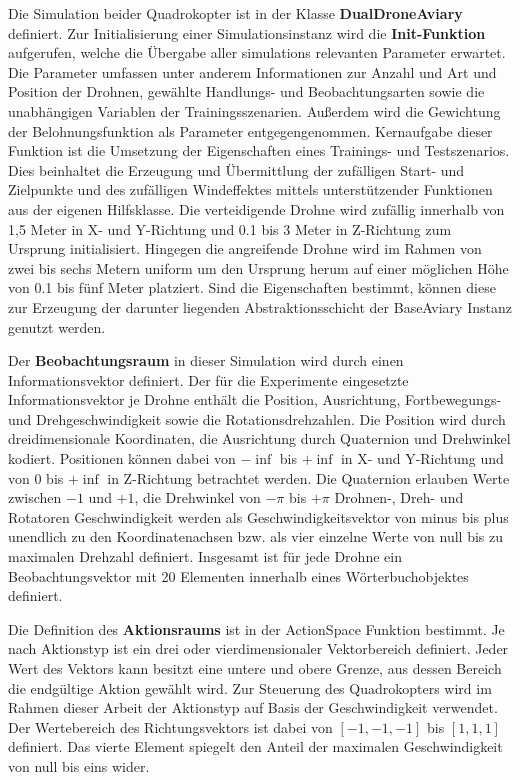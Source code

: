 Die Simulation beider Quadrokopter ist in der Klasse \textbf{DualDroneAviary} definiert.
Zur Initialisierung einer Simulationsinstanz wird die \textbf{Init-Funktion} aufgerufen, welche die Übergabe aller simulations relevanten Parameter erwartet.
Die Parameter umfassen unter anderem Informationen zur Anzahl und Art und Position der Drohnen, gewählte Handlungs- und Beobachtungsarten sowie die unabhängigen Variablen der Trainingsszenarien.
Außerdem wird die Gewichtung der Belohnungsfunktion als Parameter entgegengenommen.
Kernaufgabe dieser Funktion ist die Umsetzung der Eigenschaften eines Trainings- und Testszenarios.
Dies beinhaltet die Erzeugung und Übermittlung der zufälligen Start- und Zielpunkte und des zufälligen Windeffektes mittels unterstützender Funktionen aus der eigenen Hilfsklasse.
Die verteidigende Drohne wird zufällig innerhalb von 1,5 Meter in X- und Y-Richtung und 0.1 bis 3 Meter in Z-Richtung zum Ursprung initialisiert.
Hingegen die angreifende Drohne wird im Rahmen von zwei bis sechs Metern uniform um den Ursprung herum auf einer möglichen Höhe von 0.1 bis fünf Meter platziert.
Sind die Eigenschaften bestimmt, können diese zur Erzeugung der darunter liegenden Abstraktionsschicht der BaseAviary Instanz genutzt werden.

Der \textbf{Beobachtungsraum} in dieser Simulation wird durch einen Informationsvektor definiert.
Der für die Experimente eingesetzte Informationsvektor je Drohne enthält die Position, Ausrichtung, Fortbewegungs- und Drehgeschwindigkeit sowie die Rotationsdrehzahlen.
Die Position wird durch dreidimensionale Koordinaten, die Ausrichtung durch Quaternion und Drehwinkel kodiert.
Positionen können dabei von $- \inf$ bis $+ \inf$ in X- und Y-Richtung und von $0$ bis $+ \inf$ in Z-Richtung betrachtet werden.
Die Quaternion erlauben Werte zwischen $-1$ und $+1$, die Drehwinkel von $- \pi$ bis $+ \pi$
Drohnen-, Dreh- und Rotatoren Geschwindigkeit werden als Geschwindigkeitsvektor von minus bis plus unendlich zu den Koordinatenachsen bzw. als vier einzelne Werte von null bis zu maximalen Drehzahl definiert.
Insgesamt ist für jede Drohne ein Beobachtungsvektor mit 20 Elementen innerhalb eines Wörterbuchobjektes definiert.

Die Definition des \textbf{Aktionsraums} ist in der ActionSpace Funktion bestimmt.
Je nach Aktionstyp ist ein drei oder vierdimensionaler Vektorbereich definiert.
Jeder Wert des Vektors kann besitzt eine untere und obere Grenze, aus dessen Bereich die endgültige Aktion gewählt wird.
Zur Steuerung des Quadrokopters wird im Rahmen dieser Arbeit der Aktionstyp auf Basis der Geschwindigkeit verwendet.
Der Wertebereich des Richtungsvektors ist dabei von $[-1,-1,-1]$ bis $[1,1,1]$ definiert. 
Das vierte Element spiegelt den Anteil der maximalen Geschwindigkeit von null bis eins wider.

